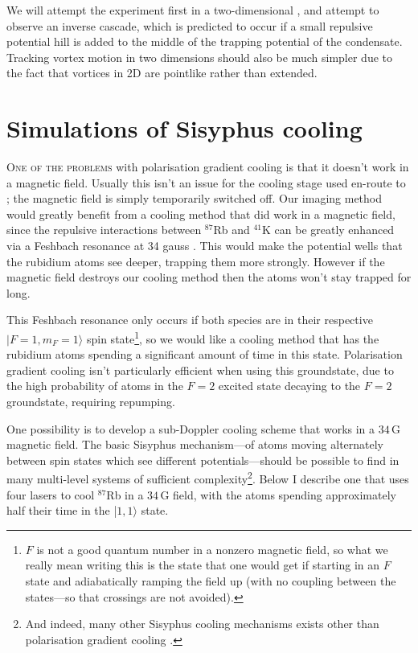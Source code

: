 We will attempt the experiment first in a two-dimensional \bec, and attempt to observe an inverse cascade, which is predicted to occur if a small repulsive potential hill is added to the middle of the trapping potential of the condensate. Tracking vortex motion in two dimensions should also be much simpler due to the fact that vortices in 2D are pointlike rather than extended.


\section{Simulations of Sisyphus cooling}\label{sec:laser_cooling_simulations}

\lettrine[lines=3]{O}{ne of the problems} with polarisation gradient cooling is that it doesn't work in a magnetic field. Usually this isn't an issue for the cooling stage used en-route to \bec; the magnetic field is simply temporarily switched off. Our imaging method would greatly benefit from a cooling method that did work in a magnetic field, since the repulsive interactions between $^{87}$Rb and $^{41}$K can be greatly enhanced via a Feshbach resonance at 34 gauss \cite{thalhammer_double_2008}. This would make the potential wells that the rubidium atoms see deeper, trapping them more strongly. However if the magnetic field destroys our cooling method then the atoms won't stay trapped for long.

This Feshbach resonance only occurs if both species are in their respective \mbox{$|F=1,m_F=1\rangle$} spin state\footnote{$F$ is not a good quantum number in a nonzero magnetic field, so what we really mean writing this is the state that one would get if starting in an $F$ state and adiabatically ramping the field up (with no coupling between the states---so that crossings are not avoided).}, so we would like a cooling method that has the rubidium atoms spending a significant amount of time in this state. Polarisation gradient cooling isn't particularly efficient when using this groundstate, due to the high probability of atoms in the $F=2$ excited state decaying to the $F=2$ groundstate, requiring repumping.

One possibility is to develop a sub-Doppler cooling scheme that works in a $34\,$G magnetic field. The basic Sisyphus mechanism---of atoms moving alternately between spin states which see different potentials---should be possible to find in many multi-level systems of sufficient complexity\footnote{And indeed, many other Sisyphus cooling mechanisms exists other than polarisation gradient cooling \cite[p 116]{metcalf_laser_1999}.}. Below I describe one that uses four lasers to cool $^{87}$Rb in a $34\,$G field, with the atoms spending approximately half their time in the \mbox{|$1,1\rangle$} state.


